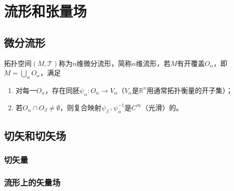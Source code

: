 \chapter{流形和张量场}

\section{微分流形}

\begin{definition}
拓扑空间$(M, \mathscr{T})$称为$n$维微分流形，简称$n$维流形，若$M$有开覆盖${O_\alpha}$，即$M = \bigcup\limits_\alpha O_\alpha$，满足
\begin{enumerate}[（a）]
\item 对每一$O_\alpha$，存在同胚$\psi_\alpha \colon O_\alpha \to V_\alpha$（$V_\alpha$是$\mathbb{R}^n$用通常拓扑衡量的开子集）；
\item 若$O_\alpha \cap O_\beta \neq \emptyset$，则复合映射$\psi_\beta \comp \psi_\alpha^{-1}$是$C^\infty$（光滑）的。
\end{enumerate}
\end{definition}

\section{切矢和切矢场}
\subsection{切矢量}
\subsection{流形上的矢量场}